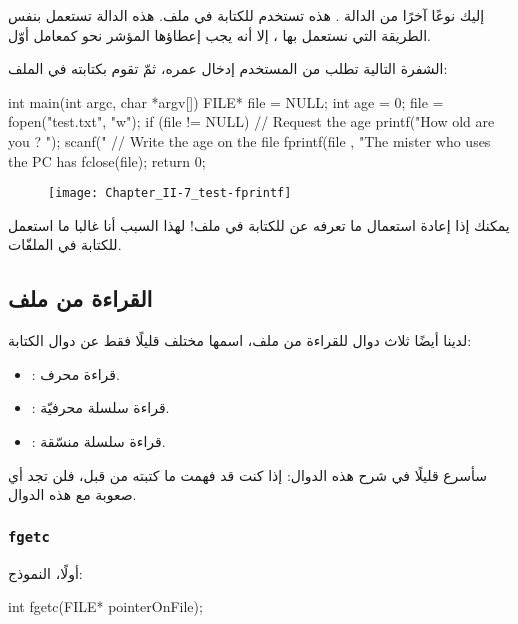 إليك نوعًا آخرًا من الدالة
.
هذه تستخدم للكتابة في ملف. هذه الدالة تستعمل بنفس الطريقة التي نستعمل بها
،
إلا أنه يجب إعطاؤها المؤشر نحو
كمعامل أوّل.

الشفرة التالية تطلب من المستخدم إدخال عمره، ثمّ تقوم بكتابته في الملف:

\begin{Csource}
int main(int argc, char *argv[])
{
	FILE* file = NULL;
	int age = 0;
	file = fopen("test.txt", "w");
	if (file != NULL)
	{
    		// Request the age
    		printf("How old are you ? ");
    		scanf("%
    		// Write the age on the file
    		fprintf(file , "The mister who uses the PC has %
    		fclose(file);
	}
 	return 0;
 }
\end{Csource}

\begin{figure}[H]
	\centering
	\texttt{[image: Chapter\_II-7\_test-fprintf]}
\end{figure}

يمكنك إذا إعادة استعمال ما تعرفه عن
للكتابة في ملف! لهذا السبب أنا غالبا ما استعمل
للكتابة في الملفّات.

\subsection{القراءة من ملف}

لدينا أيضًا ثلاث دوال للقراءة من ملف، اسمها مختلف قليلًا فقط عن دوال الكتابة:

\begin{itemize}
  \item {}:
 قراءة محرف.
  \item {}:
قراءة سلسلة محرفيّة.
  \item {}:
قراءة سلسلة منسّقة.
\end{itemize}

سأسرع قليلًا في شرح هذه الدوال: إذا كنت قد فهمت ما كتبته من قبل، فلن تجد أي صعوبة مع هذه الدوال.

\subsubsection{\texttt{fgetc}}
أولًا، النموذج:

\begin{Csource}
int fgetc(FILE* pointerOnFile);
\end{Csource}

